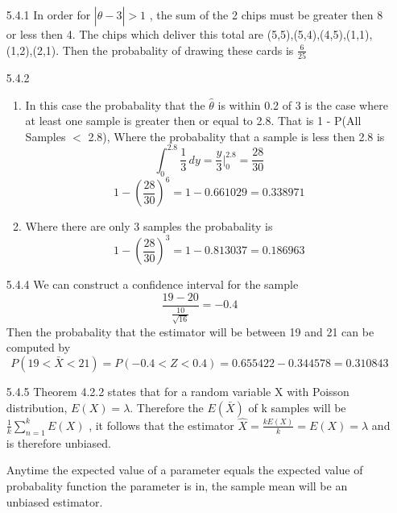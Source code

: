 \documentclass[11pt,fleqn]{article}
\begin{document}
\begin{enumerate}
  \item[5.4.1]
  In order for $| \hat{\theta} -3 | > 1 $ , the sum of the 2 chips must be
  greater then 8 or less then 4. The chips which deliver this total are
  (5,5),(5,4),(4,5),(1,1),(1,2),(2,1). Then the probabality of drawing these
  cards is $\frac{6}{25}$
  \item[5.4.2]
  \begin{enumerate}
      \item
      	In this case the probabality that the $\hat{\theta}$ is within 0.2 of 3
      	is the case where at least one sample is greater then or equal to 2.8.
      	That is 1 - P(All Samples $<$ 2.8), Where the probabality that a sample
      	is less then 2.8 is
      	\[
      		\int_0^{2.8} \frac{1}{3}\,dy = \frac{y}{3}|_0^{2.8} = \frac{28}{30}
      	\]
      	\[
      	1 - \left(\frac{28}{30}\right)^6 = 1 - 0.661029 = 0.338971
      	\]
      \item 
      	Where there are only 3 samples the probabality is
      	\[
      	1 - \left(\frac{28}{30}\right)^3 = 1 - 0.813037 = 0.186963 
      	\]
  \end{enumerate}
  \item[5.4.4]
  We can construct a confidence interval for the sample 
  \[
  	\frac{19 - 20}{\frac{10}{\sqrt{16}}} = -0.4
  \]
  Then the probabality that the estimator will be between 19 and 21 can be
  computed by 
  \[
  	P(19<\bar{X}<21) = P(-0.4 < Z < 0.4) = 0.655422 - 0.344578 = 0.310843
  \]
  \item[5.4.5]
  Theorem 4.2.2 states that for a random variable X with Poisson distribution,
  $E(X) = \lambda$. Therefore the $E(\bar{X})$ of k samples will be
  $\frac{1}{k}\displaystyle\sum_{n=1}^{k} E(X)$ , it follows that the estimator
  $\hat{X} = \frac{kE(X)}{k} = E(X) = \lambda$ and is therefore unbiased. 
  
  Anytime the expected value of a parameter equals the expected value of
  probabality function the parameter is in, the sample mean will be an unbiased
  estimator. 
\end{enumerate}
\end{document}
